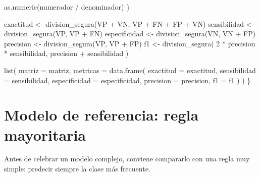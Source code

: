 \documentclass[
  spanish,
  10.5pt,
  letterpaper,
  openany,
  headings=big]{scrbook}
\newenvironment{Shaded}{}{}
\newcommand{\AttributeTok}[1]{\textcolor[rgb]{0.84,0.23,0.29}{#1}}
\newcommand{\DecValTok}[1]{\textcolor[rgb]{0.00,0.36,0.77}{#1}}
\newcommand{\FunctionTok}[1]{\textcolor[rgb]{0.44,0.26,0.76}{#1}}
\newcommand{\NormalTok}[1]{\textcolor[rgb]{0.14,0.16,0.18}{#1}}
\newcommand{\OtherTok}[1]{\textcolor[rgb]{0.44,0.26,0.76}{#1}}
\newcommand{\SpecialCharTok}[1]{\textcolor[rgb]{0.00,0.36,0.77}{#1}}
\begin{document}
\begin{Shaded}
\begin{Highlighting}[]
    \FunctionTok{as.numeric}\NormalTok{(numerador }\SpecialCharTok{/}\NormalTok{ denominador)}
\NormalTok{  \}}

\NormalTok{  exactitud }\OtherTok{\textless{}{-}} \FunctionTok{division\_segura}\NormalTok{(VP }\SpecialCharTok{+}\NormalTok{ VN, VP }\SpecialCharTok{+}\NormalTok{ FN }\SpecialCharTok{+}\NormalTok{ FP }\SpecialCharTok{+}\NormalTok{ VN)}
\NormalTok{  sensibilidad }\OtherTok{\textless{}{-}} \FunctionTok{division\_segura}\NormalTok{(VP, VP }\SpecialCharTok{+}\NormalTok{ FN)}
\NormalTok{  especificidad }\OtherTok{\textless{}{-}} \FunctionTok{division\_segura}\NormalTok{(VN, VN }\SpecialCharTok{+}\NormalTok{ FP)}
\NormalTok{  precision }\OtherTok{\textless{}{-}} \FunctionTok{division\_segura}\NormalTok{(VP, VP }\SpecialCharTok{+}\NormalTok{ FP)}
\NormalTok{  f1 }\OtherTok{\textless{}{-}} \FunctionTok{division\_segura}\NormalTok{(}
    \DecValTok{2} \SpecialCharTok{*}\NormalTok{ precision }\SpecialCharTok{*}\NormalTok{ sensibilidad,}
\NormalTok{    precision }\SpecialCharTok{+}\NormalTok{ sensibilidad}
\NormalTok{  )}

  \FunctionTok{list}\NormalTok{(}
    \AttributeTok{matriz =}\NormalTok{ matriz,}
    \AttributeTok{metricas =} \FunctionTok{data.frame}\NormalTok{(}
      \AttributeTok{exactitud =}\NormalTok{ exactitud,}
      \AttributeTok{sensibilidad =}\NormalTok{ sensibilidad,}
      \AttributeTok{especificidad =}\NormalTok{ especificidad,}
      \AttributeTok{precision =}\NormalTok{ precision,}
      \AttributeTok{f1 =}\NormalTok{ f1}
\NormalTok{    )}
\NormalTok{  )}
\NormalTok{\}}
\end{Highlighting}
\end{Shaded}

\section{Modelo de referencia: regla
mayoritaria}\label{modelo-de-referencia-regla-mayoritaria}

Antes de celebrar un modelo complejo, conviene compararlo con una regla
muy simple: predecir siempre la clase más frecuente.
\end{document}
